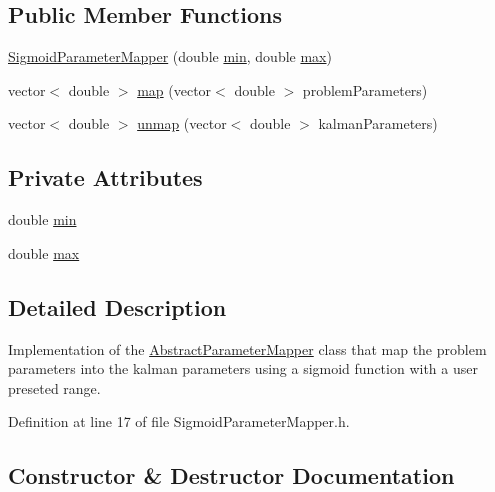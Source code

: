 \subsection*{Public Member Functions}
\begin{DoxyCompactItemize}
\item 
\mbox{\hyperlink{classSigmoidParameterMapper_a1f39049fb6a69ae650161d52158a2f10}{Sigmoid\+Parameter\+Mapper}} (double \mbox{\hyperlink{classSigmoidParameterMapper_a55543b10e333cbe122bef3fdffbe1bf9}{min}}, double \mbox{\hyperlink{classSigmoidParameterMapper_a87e681e19a32deadc0231f979636ad17}{max}})
\item 
vector$<$ double $>$ \mbox{\hyperlink{classSigmoidParameterMapper_a808db49587ff6c2d2c2b2efc84de80f6}{map}} (vector$<$ double $>$ problem\+Parameters)
\item 
vector$<$ double $>$ \mbox{\hyperlink{classSigmoidParameterMapper_a5b7031c2945f69130e0423427525e256}{unmap}} (vector$<$ double $>$ kalman\+Parameters)
\end{DoxyCompactItemize}
\subsection*{Private Attributes}
\begin{DoxyCompactItemize}
\item 
double \mbox{\hyperlink{classSigmoidParameterMapper_a55543b10e333cbe122bef3fdffbe1bf9}{min}}
\item 
double \mbox{\hyperlink{classSigmoidParameterMapper_a87e681e19a32deadc0231f979636ad17}{max}}
\end{DoxyCompactItemize}


\subsection{Detailed Description}
Implementation of the \mbox{\hyperlink{classAbstractParameterMapper}{Abstract\+Parameter\+Mapper}} class that map the problem parameters into the kalman parameters using a sigmoid function with a user preseted range. 

Definition at line 17 of file Sigmoid\+Parameter\+Mapper.\+h.



\subsection{Constructor \& Destructor Documentation}
\mbox{\label{classSigmoidParameterMapper_a1f39049fb6a69ae650161d52158a2f10}} 
